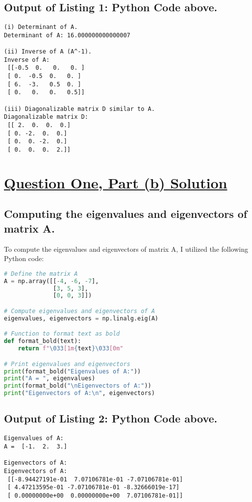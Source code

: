 \documentclass{article}
\begin{document}
\subsection*{Output of Listing 1: Python Code above.}

\begin{verbatim}
(i) Determinant of A. 
Determinant of A: 16.000000000000007

(ii) Inverse of A (A^-1). 
Inverse of A:
 [[-0.5  0.   0.   0. ]
 [ 0.  -0.5  0.   0. ]
 [ 6.  -3.   0.5  0. ]
 [ 0.   0.   0.   0.5]]

(iii) Diagonalizable matrix D similar to A. 
Diagonalizable matrix D:
 [[ 2.  0.  0.  0.]
 [ 0. -2.  0.  0.]
 [ 0.  0. -2.  0.]
 [ 0.  0.  0.  2.]]
\end{verbatim}

\section*{\uline{\large Question One, Part (b) Solution}}

\subsection*{Computing the eigenvalues and eigenvectors of matrix A.}
To compute the eigenvalues and eigenvectors of matrix A, I utilized the following Python code:
\begin{lstlisting}[language=Python, caption={Python Code}]
# Define the matrix A
A = np.array([[-4, -6, -7],
              [3, 5, 3],
              [0, 0, 3]])

# Compute eigenvalues and eigenvectors of A
eigenvalues, eigenvectors = np.linalg.eig(A)

# Function to format text as bold
def format_bold(text):
    return f"\033[1m{text}\033[0m"

# Print eigenvalues and eigenvectors
print(format_bold("Eigenvalues of A:"))
print("A = ", eigenvalues)
print(format_bold("\nEigenvectors of A:"))
print("Eigenvectors of A:\n", eigenvectors)
\end{lstlisting}

\subsection*{Output of Listing 2: Python Code above.}

\begin{verbatim}
Eigenvalues of A:
A =  [-1.  2.  3.]

Eigenvectors of A:
Eigenvectors of A:
 [[-8.94427191e-01  7.07106781e-01 -7.07106781e-01]
 [ 4.47213595e-01 -7.07106781e-01 -8.32666019e-17]
 [ 0.00000000e+00  0.00000000e+00  7.07106781e-01]]
\end{verbatim}
\end{document}
